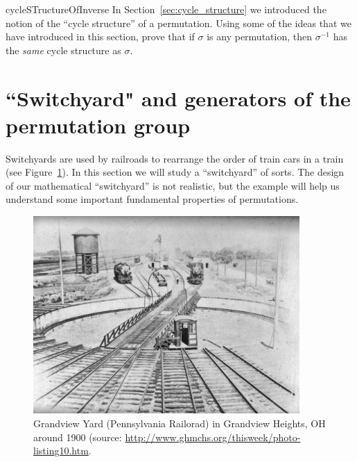 \begin{exercise}{cycleSTructureOfInverse}
In Section~\ref{sec:cycle_structure} we introduced the notion of the ``cycle structure'' of a permutation. Using some of the ideas that we have introduced in this section, prove that if $\sigma$ is any permutation, then $\sigma^{-1}$ has the \emph{same} cycle structure as $\sigma$.
\end{exercise}


\section{``Switchyard" and generators of the permutation group\quad
{}}
\label{sec:Permutation:SwitchyardAndGenerators}

Switchyards are used by railroads to rearrange the order of train cars in a train (see Figure~\ref{fig:grandview}). In this section we will study a ``switchyard'' of sorts. The design of our mathematical ``switchyard'' is not realistic, but the example will help us understand some important fundamental properties of permutations.
\begin{figure}[ht]
\begin{center}
\includegraphics[width=4in]{images/GrandviewYard.jpg}
\caption{Grandview Yard (Pennsylvania Railorad) in Grandview Heights, OH around 1900 (source: \url{http://www.ghmchs.org/thisweek/photo-listing10.htm}. }\label{fig:grandview}
\end{center}
\end{figure}

